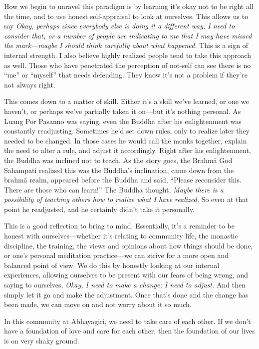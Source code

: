 How we begin to unravel this paradigm is by learning it's okay not to 
be right all the time, and to use honest self-appraisal to look at 
ourselves. This allows us to say \emph{Okay, perhaps since everybody 
else is doing it a different way, I need to consider that, or a number 
of people are indicating to me that I may have missed the mark---maybe 
I should think carefully about what happened.} This is a sign of 
internal strength. I also believe highly realized people tend to take 
this approach as well. Those who have penetrated the perception of 
not-self can see there is no ``me'' or ``myself'' that needs defending. 
They know it's not a problem if they're not always right.

This comes down to a matter of skill. Either it's a skill we've 
learned, or one we haven't, or perhaps we've partially taken it 
on---but it's nothing personal. As Luang Por Pasanno was saying, even 
the Buddha after his enlightenment was constantly readjusting. 
Sometimes he'd set down rules, only to realize later they needed to be 
changed. In those cases he would call the monks together, explain the 
need to alter a rule, and adjust it accordingly. Right after his 
enlightenment, the Buddha was inclined not to teach. As the story goes, 
the Brahmā God Sahampati realized this was the Buddha's inclination, 
came down from the brahmā realm, appeared before the Buddha and said, 
``Please reconsider this. There are those who can learn!'' The Buddha 
thought, \emph{Maybe there is a possibility of teaching others how to 
realize what I have realized.} So even at that point he readjusted, and 
he certainly didn't take it personally.

This is a good reflection to bring to mind. Essentially, it's a 
reminder to be honest with ourselves---whether it's relating to 
community life, the monastic discipline, the training, the views and 
opinions about how things should be done, or one's personal meditation 
practice---we can strive for a more open and balanced point of view. We 
do this by honestly looking at our internal experiences, allowing 
ourselves to be present with our fears of being wrong, and saying to 
ourselves, \emph{Okay, I need to make a change; I need to adjust.} And 
then simply let it go and make the adjustment. Once that's done and the 
change has been made, we can move on and not worry about it so much.


In this community at Abhayagiri, we need to take care of each other. If 
we don't have a foundation of love and care for each other, then the 
foundation of our lives is on very shaky ground.

